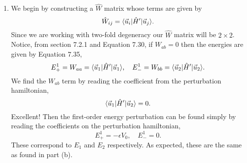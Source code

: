 \documentclass[a4paper, 12pt]{config/homework}
\begin{document}
\begin{enumerate}
\begin{enumerate}[label=(\alph*)]
\pagebreak
\item We begin by constructing a \(\hat{W}\) matrix whose terms are given by
\[\hat{W}_{ij} = \bra*{\vec{u}_i}\hat{H}'\ket*{\vec{u}_j}.\]
Since we are working with two-fold degeneracy our \(\hat{W}\) matrix will be \(2\times 2\). Notice, from section 7.2.1 and Equation 7.30, if \(W_{ab}=0\) then the energies are given by Equation 7.35,
\[E_+^1 = W_{aa} = \bra*{\vec{u}_1}\hat{H}'\ket*{\vec{u}_1}, \quad E_-^1 = W_{bb} = \bra*{\vec{u}_2}\hat{H}'\ket*{\vec{u}_2}.\]
We find the \(W_{ab}\) term by reading the coefficient from the perturbation hamiltonian,
\[\bra*{\vec{u}_1}\hat{H}'\ket*{\vec{u}_2} = 0.\]
Excellent! Then the first-order energy perturbation can be found simply by reading the coefficients on the perturbation hamiltonian,
\[E_+^1 = -\epsilon V_0, \quad E_-^1 = 0.\]
These correspond to \(E_1\) and \(E_2\) respectively. As expected, these are the same as found in part (b).
\end{enumerate}
\end{enumerate}
\end{document}
